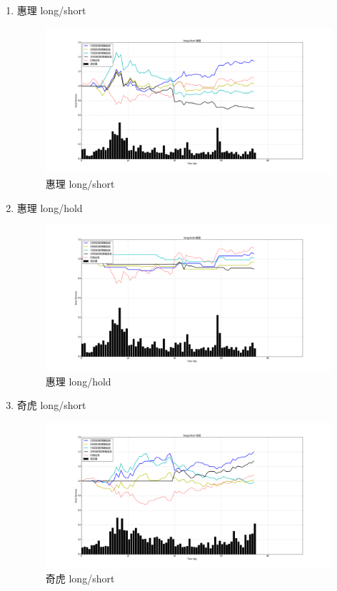 \documentclass[12pt,a4paper]{article}
\begin{document}
\begin{enumerate}[1.]
\item 惠理 long/short


\begin{figure}[H]
	\centering
	\includegraphics[width=1.0\textwidth]{img_r_2/short/hl.png}
	\caption{惠理 long/short}
\end{figure}

\item 惠理 long/hold

\begin{figure}[H]
	\centering
	\includegraphics[width=1.0\textwidth]{img_r_2/hold/hl.png}
	\caption{惠理 long/hold }
\end{figure}

\item 奇虎 long/short


\begin{figure}[H]
	\centering
	\includegraphics[width=1.0\textwidth]{img_r_2/short/qihu.png}
	\caption{奇虎 long/short}
\end{figure}


\end{enumerate}
\end{document}

